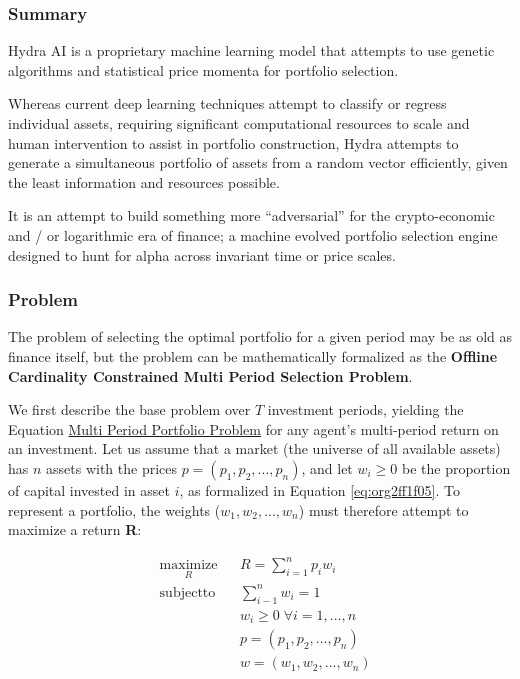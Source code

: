 \documentclass[11pt, a4paper]{awesome-cv}
\begin{document}
\begin{cvletter}

\subsubsection{Summary}

Hydra AI is a proprietary machine learning model that attempts to use genetic
algorithms and statistical price momenta for portfolio selection.

Whereas current deep learning techniques attempt to classify or regress
individual assets, requiring significant computational resources to scale and
human intervention to assist in portfolio construction, Hydra attempts to
generate a simultaneous portfolio of assets from a random vector efficiently,
given the least information and resources possible.

It is an attempt to build something more ``adversarial'' for the crypto-economic
and / or logarithmic era of finance; a machine evolved portfolio selection
engine designed to hunt for alpha across invariant time or price scales.


\subsubsection{Problem}

The problem of selecting the optimal portfolio for a given period may be as old
as finance itself, but the problem can be mathematically formalized as the \textbf{Offline Cardinality Constrained Multi Period Selection Problem}.

We first describe the base problem over \(T\) investment periods, yielding the
Equation \hyperref[eq:org8bc3e7c]{Multi Period Portfolio Problem} for any agent's multi-period return on an investment. Let us assume that a market (the universe of all available assets) has \(n\) assets with the prices \(p = (p_1 , p_2 , . . . , p_n)\), and let \(w_{i} \geq 0\) be the proportion of capital invested in asset \(i\), as formalized in Equation \ref{eq:org2ff1f05}. To represent a portfolio, the weights (\(w_{1} , w_{2} , . . . , w_{n}\)) must therefore attempt to maximize a return \textbf{R}:

\begin{equation}
\label{eq:org2ff1f05}
\begin{aligned}
& \underset{R}{\mathrm{maximize}}
& & R = \sum_{i=1}^{n} p_i w_i \\
& \mathrm{subject to} & &  \sum_{i-1}^{n} w_i =1 \\
& & & w_i \geq 0 \; \forall i = 1,...,n \\
& & & p = (p_1 , p_2 , . . . , p_n) \\
& & & w = (w_1 , w_2 , . . . , w_n) \\
\end{aligned}
\end{equation}


\end{cvletter}
\end{document}
